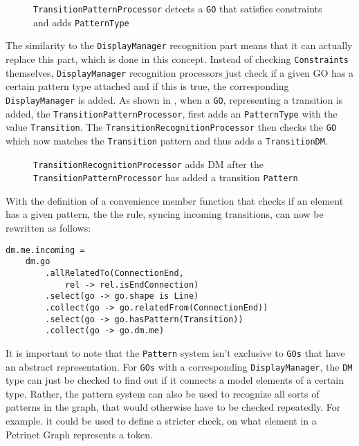 \begin{figure}
  \centering
  
  \caption{\texttt{TransitionPatternProcessor} detects a \texttt{GO} that satisfies constraints and adds \texttt{PatternType}}
  \label{fig:kind-recognition}
\end{figure}

The similarity to the \texttt{DisplayManager} recognition part means that it can actually replace this part, which is done in this concept. Instead of checking \texttt{Constraints} themselves, \texttt{DisplayManager} recognition processors just check if a given GO has a certain pattern type attached and if this is true, the corresponding \texttt{DisplayManager} is added. As shown in , when a \texttt{GO}, representing a transition is added, the \texttt{TransitionPatternProcessor}, first adds an \texttt{PatternType} with the value \texttt{Transition}. The \texttt{TransitionRecognitionProcessor} then checks the \texttt{GO} which now matches the \texttt{Transition} pattern and thus adds a \texttt{TransitionDM}.

\begin{figure}[ht]
  \centering
  
  \caption{\texttt{TransitionRecognitionProcessor} adds DM after the \texttt{TransitionPatternProcessor} has added a transition \texttt{Pattern}}
  \label{fig:Transition-Kind-Recognition}
\end{figure}

With the definition of a convenience member function that checks if an element has a given pattern, the the rule, syncing incoming transitions, can now be rewritten as follows:
\begin{lstlisting}[captionpos=b,caption={Improved incoming transition rule, that also filters for elements with a that match the \texttt{Transition} pattern.}]
dm.me.incoming = 
    dm.go
        .allRelatedTo(ConnectionEnd,
            rel -> rel.isEndConnection)
        .select(go -> go.shape is Line)
        .collect(go -> go.relatedFrom(ConnectionEnd))
        .select(go -> go.hasPattern(Transition))
        .collect(go -> go.dm.me)
\end{lstlisting}


It is important to note that the \texttt{Pattern} system isn't exclusive to \texttt{GOs} that have an abstract representation. For \texttt{GOs} with a corresponding \texttt{DisplayManager}, the \texttt{DM} type can just be checked to find out if it connects a model elements of a certain type. Rather, the pattern system can also be used to recognize all sorts of patterns in the graph, that would otherwise have to be checked repeatedly. For example. it could be used to define a stricter check, on what element in a Petrinet Graph represents a token.

